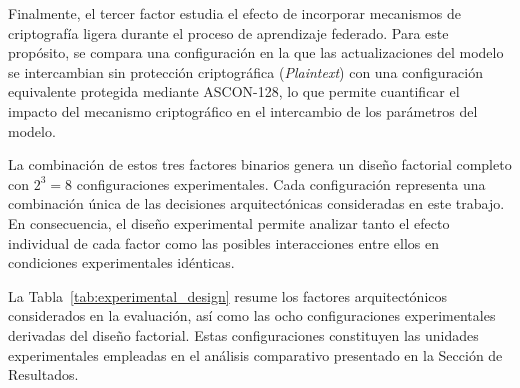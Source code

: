 \documentclass[journal,article,submit,moreauthors]{Definitions/mdpi}
\begin{document}
Finalmente, el tercer factor estudia el efecto de incorporar mecanismos de criptografía ligera durante el proceso de aprendizaje federado. Para este propósito, se compara una configuración en la que las actualizaciones del modelo se intercambian sin protección criptográfica (\textit{Plaintext}) con una configuración equivalente protegida mediante ASCON-128, lo que permite cuantificar el impacto del mecanismo criptográfico en el intercambio de los parámetros del modelo.

La combinación de estos tres factores binarios genera un diseño factorial completo con $2^{3}=8$ configuraciones experimentales. Cada configuración representa una combinación única de las decisiones arquitectónicas consideradas en este trabajo. En consecuencia, el diseño experimental permite analizar tanto el efecto individual de cada factor como las posibles interacciones entre ellos en condiciones experimentales idénticas.

La Tabla~\ref{tab:experimental_design} resume los factores arquitectónicos considerados en la evaluación, así como las ocho configuraciones experimentales derivadas del diseño factorial. Estas configuraciones constituyen las unidades experimentales empleadas en el análisis comparativo presentado en la Sección de Resultados.
\end{document}
